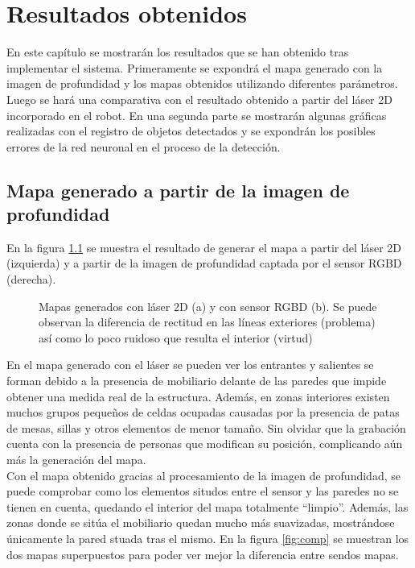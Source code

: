 \chapter{Resultados obtenidos} \label{chapter.resultados}

En este capítulo se mostrarán los resultados que se han obtenido tras implementar el sistema. Primeramente se expondrá el mapa generado con la imagen de profundidad y los mapas obtenidos utilizando diferentes parámetros. Luego se hará una comparativa con el resultado obtenido a partir del láser 2D incorporado en el robot. En una segunda parte se mostrarán algunas gráficas realizadas con el registro de objetos detectados y se expondrán los posibles errores de la red neuronal en el proceso de la detección.\\

\section{Mapa generado a partir de la imagen de profundidad}

En la figura \ref{fig:res_mapas} se muestra el resultado de generar el mapa a partir del láser 2D (izquierda) y a partir de la imagen de profundidad captada por el sensor RGBD (derecha).\\

\begin{figure}[h]
 \centering
 \caption{Mapas generados con láser 2D (a) y con sensor RGBD (b). Se puede observan la diferencia de rectitud en las líneas exteriores (problema) así como lo poco ruidoso que resulta el interior (virtud)}
 \label{fig:res_mapas}
\end{figure}

En el mapa generado con el láser se pueden ver los entrantes y salientes se forman debido a la presencia de mobiliario delante de las paredes que impide obtener una medida real de la estructura. Además, en zonas interiores existen muchos grupos pequeños de celdas ocupadas causadas por la presencia de patas de mesas, sillas y otros elementos de menor tamaño. Sin olvidar que la grabación cuenta con la presencia de personas que modifican su posición, complicando aún más la generación del mapa.\\

Con el mapa obtenido gracias al procesamiento de la imagen de profundidad, se puede comprobar como los elementos situdos entre el sensor y las paredes no se tienen en cuenta, quedando el interior del mapa totalmente ``limpio''. Además, las zonas donde se sitúa el mobiliario quedan mucho más suavizadas, mostrándose únicamente la pared stuada tras el mismo. En la figura \ref{fig:comp} se muestran los dos mapas superpuestos para poder ver mejor la diferencia entre sendos mapas.\\

